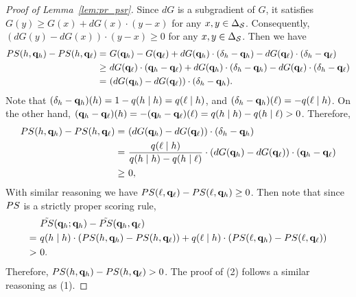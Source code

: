\begin{proof}[Proof of Lemma~\ref{lem:pr_psr}]
    Since $dG$ is a subgradient of $G$, it satisfies $G(y) \ge G(x) + dG(x) \cdot (y - x)$ for any $x, y \in \Delta_{\mathcal{S}}$. Consequently, $(dG(y) - dG(x))\cdot (y - x) \ge 0$ for any $x, y \in \Delta_{\mathcal{S}}$. 
    Then we have 
    \begin{align*}
        PS(h, \mathbf{q}_h) - PS(h, \mathbf{q}_{\ell}) =&\ G(\mathbf{q}_h) - G(\mathbf{q}_{\ell}) + dG(\mathbf{q}_h)\cdot(\delta_h - \mathbf{q}_h) - dG(\mathbf{q}_{\ell})\cdot(\delta_h - \mathbf{q}_{\ell})\\
        \ge&\ dG(\mathbf{q}_{\ell})\cdot (\mathbf{q}_h - \mathbf{q}_{\ell})+ dG(\mathbf{q}_h)\cdot(\delta_h - \mathbf{q}_h) - dG(\mathbf{q}_{\ell})\cdot(\delta_h - \mathbf{q}_{\ell})\\
        =&\ (dG(\mathbf{q}_h) - dG(\mathbf{q}_{\ell}))\cdot (\delta_h - \mathbf{q}_{h}). 
    \end{align*}
    Note that $(\delta_h - \mathbf{q}_{h})(h) = 1 - q(h\mid h) = q(\ell \mid h)$, and $(\delta_h - \mathbf{q}_{h})(\ell) =-q(\ell \mid h)$. On the other hand, $(\mathbf{q}_h - \mathbf{q}_{\ell})(h) = -(\mathbf{q}_h - \mathbf{q}_{\ell})(\ell) = q(h \mid h) - q(h \mid \ell) > 0$. Therefore, 
    \begin{align*}
        PS(h, \mathbf{q}_h) - PS(h, \mathbf{q}_{\ell}) =&\ (dG(\mathbf{q}_h) - dG(\mathbf{q}_{\ell}))\cdot (\delta_h - \mathbf{q}_{h})\\
        =&\ \frac{q(\ell \mid h)}{q(h\mid h) - q(h \mid \ell)} \cdot (dG(\mathbf{q}_h) - dG(\mathbf{q}_{\ell}))\cdot (\mathbf{q}_h - \mathbf{q}_{\ell})\\
        \ge &\ 0,
    \end{align*}
    With similar reasoning we have $PS(\ell, \mathbf{q}_{\ell}) - PS(\ell, \mathbf{q}_h) \ge 0$.
    Then note that since $PS$ is a strictly proper scoring rule, 
    \begin{align*}
        &\ \eps(\vpr_h; \vpr_h) - \eps(\vpr_h, \vpr_\ell)\\ = &\ \pr(h\mid h)\cdot (\ps(h, \vpr_h) - \ps(h, \vpr_\ell)) + \pr(\ell \mid h) \cdot(\ps(\ell, \vpr_h) - \ps(\ell, \vpr_\ell))\\
        >&\  0. 
    \end{align*}
    Therefore, $PS(h, \mathbf{q}_h) - PS(h, \mathbf{q}_\ell) > 0$.
    The proof of (2) follows a similar reasoning as (1). 
\end{proof}


